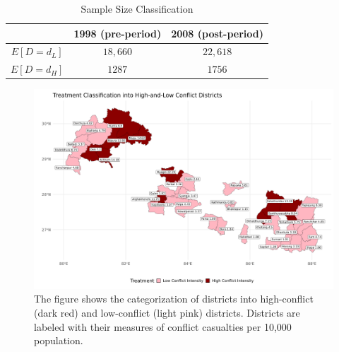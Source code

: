 \documentclass[12pt,a4paper]{article}
\providecommand{\tabularnewline}{\\}
\begin{document}
	\begin{table}[H]
		\caption{Sample Size Classification}
		
		\renewcommand{\arraystretch}{1.2}
		\vspace{1em}
		\centering{}%
		\begin{tabular}{c|c|c}
			& 1998 (pre-period) & 2008 (post-period)\tabularnewline
			\hline 
			$E[D = d_{L}]$ & $18,660$ & $22,618$\tabularnewline
			$E[D = d_{H}]$ & $1287$ & $1756$\tabularnewline
			\hline 
		\end{tabular}
	\end{table}
	
	
	
	
\begin{figure}[H]
	\centering
	\includegraphics[width=1\textwidth]{../Analysis files/overall_conflict_map.png}
	\caption{The figure shows the categorization of districts into high-conflict (dark red) and low-conflict (light pink) districts. Districts are labeled with their measures of conflict casualties per 10,000 population.}
	\label{fig:overall_conflict_map}
\end{figure}
\end{document}
